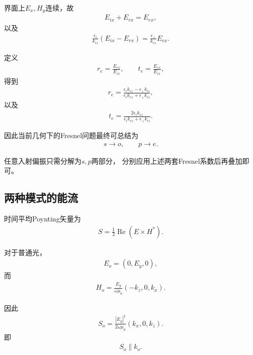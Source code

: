 \documentclass{article}
\begin{document}
界面上$E_x,H_y$连续，故
\begin{align}
    E_{ix}+E_{rx}=E_{ex},
\end{align}
以及
\begin{align}
    \frac{\epsilon_i}{k_{iz}}
    (E_{ix}-E_{rx})
    =
    \frac{\epsilon_\perp}{k_{ez}}
    E_{ex}.
\end{align}

定义
\begin{align}
    r_e=\frac{E_{rx}}{E_{ix}},
    \qquad
    t_e=\frac{E_{ex}}{E_{ix}},
\end{align}
得到
\begin{align}
    \boxed{
    r_e
    =
    \frac{
    \epsilon_i k_{ez}
    -
    \epsilon_\perp k_{iz}
    }{
    \epsilon_i k_{ez}
    +
    \epsilon_\perp k_{iz}
    }
    },
\end{align}
以及
\begin{align}
    \boxed{
    t_e
    =
    \frac{
    2\epsilon_i k_{ez}
    }{
    \epsilon_i k_{ez}
    +
    \epsilon_\perp k_{iz}
    }
    }.
\end{align}

因此当前几何下的Fresnel问题最终可总结为
\begin{align}
    \boxed{
    s\rightarrow o,
    \qquad
    p\rightarrow e
    }.
\end{align}

任意入射偏振只需分解为$s,p$两部分，
分别应用上述两套Fresnel系数后再叠加即可。

\subsection{两种模式的能流}

时间平均Poynting矢量为
\begin{align}
    S
    =
    \frac12
    \operatorname{Re}
    \left(
    E\times H^*
    \right).
\end{align}

对于普通光，
\begin{align}
    E_o=(0,E_y,0),
\end{align}
而
\begin{align}
    H_o
    =
    \frac{E_y}{\omega\mu_0}
    (-k_z,0,k_x).
\end{align}

因此
\begin{align}
    \boxed{
    S_o
    =
    \frac{|E_y|^2}
    {2\omega\mu_0}
    (k_x,0,k_z)
    }.
\end{align}
即
\begin{align}
    \boxed{
    S_o\parallel k_o
    }.
\end{align}
\end{document}
